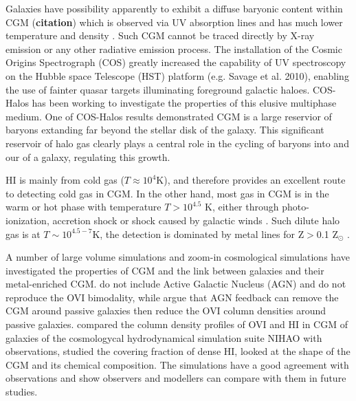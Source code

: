 \documentclass[useAMS,usenatbib]{mn2e}
\def \ion#1#2{#1{\footnotesize{#2}}\relax}
\def \hi       {\ion{H}{I}}
\def \ovi      {\ion{O}{VI}}
\begin{document}
Galaxies have possibility apparently to exhibit a diffuse baryonic
content within CGM ({\bf citation}) which is observed via UV absorption
lines and has much lower temperature and density \citep{Werk13}.
Such CGM cannot be traced directly by X-ray emission or any other
radiative emission process.
The installation of the Cosmic Origins Spectrograph (COS) greatly
increased the capability of UV spectroscopy on the Hubble space
Telescope (HST) platform (e.g. Savage et al. 2010), enabling the
use of fainter quasar targets illuminating foreground galactic
haloes.
COS-Halos \citep{Tumlinson11, Thom12, Werk12, Werk13} has been 
working to investigate 
the properties of this elusive multiphase medium.
One of COS-Halos results demonstrated CGM is a large reservior
of baryons extanding far beyond the stellar disk of the galaxy.
This significant reservoir of halo gas clearly plays a central 
role in the cycling of baryons into and our of a galaxy, 
regulating this growth. 

\hi{}  is mainly from cold gas 
($T\approx 10^4$K), and therefore provides an excellent route to 
detecting cold gas in CGM.
In the other hand, most gas in CGM is in the warm or hot phase
with temperature $T > 10^{4.5}$ K, either through photo-ionization,
accretion shock or shock caused by galactic winds \citep{voort12}.
Such dilute halo gas is at $T \sim 10^{4.5-7}$K, 
the detection is dominated by metal lines for Z$>$0.1 Z$_{\odot}$ \citep{Wiersma09a}.

A number of large volume simulations \citep{Ford13, Ford15, Suresh15, 
Oppenheimer16} and 
zoom-in cosmological simulations \citep{Stinson12,Hummels13,Shull14} have 
investigated the properties of CGM and the link between 
galaxies and their metal-enriched CGM.
\citet{Ford15} do not include Active Galactic Nucleus (AGN) and do not
reproduce the \ovi{} bimodality, while \citet{Suresh15b} argue that
AGN feedback can remove the CGM around passive galaxies then reduce
the \ovi{} column densities around  passive galaxies.
\citet{Gutcke16} compared the column density profiles of \ovi{} and \hi{}
in CGM of galaxies of the cosmologycal hydrodynamical simulation suite 
NIHAO \citep{Wang15} with observations, studied the covering fraction of 
dense \hi{}, looked at the shape of the CGM and its chemical composition.
The simulations have a good agreement with observations and show observers
and modellers can compare with them in future studies. 
\end{document}
